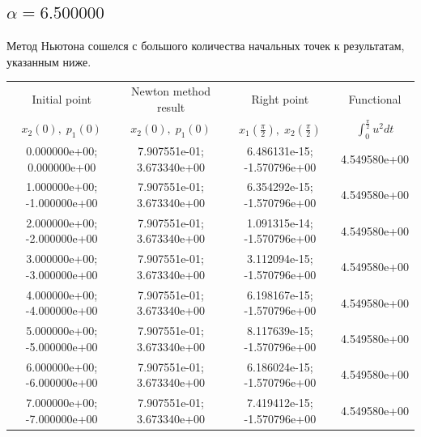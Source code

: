 \documentclass[titlepage]{article}
\def\l{\left}
\def\r{\right}
\begin{document}
\subsection{$\alpha = 6.500000$} 
Метод Ньютона сошелся с большого количества начальных точек к результатам, указанным ниже. \\ 
\begin{tabular}{ | c | c | c | c |} 
\hline 
Initial point  & Newton method result & Right point & Functional 
 \\ $x_2(0), \; p_1(0)$ & $x_2(0), \; p_1(0)$ & $x_1\l(\frac{\pi}{2}\r), \; x_2\l(\frac{\pi}{2}\r)$ & $\int_{0}^{\frac{\pi}{2}}u^2dt$  \\ \hline 
0.000000e+00; 0.000000e+00 & 7.907551e-01; 3.673340e+00 & 6.486131e-15; -1.570796e+00 & 4.549580e+00 \\ \hline 
1.000000e+00; -1.000000e+00 & 7.907551e-01; 3.673340e+00 & 6.354292e-15; -1.570796e+00 & 4.549580e+00 \\ \hline 
2.000000e+00; -2.000000e+00 & 7.907551e-01; 3.673340e+00 & 1.091315e-14; -1.570796e+00 & 4.549580e+00 \\ \hline 
3.000000e+00; -3.000000e+00 & 7.907551e-01; 3.673340e+00 & 3.112094e-15; -1.570796e+00 & 4.549580e+00 \\ \hline 
4.000000e+00; -4.000000e+00 & 7.907551e-01; 3.673340e+00 & 6.198167e-15; -1.570796e+00 & 4.549580e+00 \\ \hline 
5.000000e+00; -5.000000e+00 & 7.907551e-01; 3.673340e+00 & 8.117639e-15; -1.570796e+00 & 4.549580e+00 \\ \hline 
6.000000e+00; -6.000000e+00 & 7.907551e-01; 3.673340e+00 & 6.186024e-15; -1.570796e+00 & 4.549580e+00 \\ \hline 
7.000000e+00; -7.000000e+00 & 7.907551e-01; 3.673340e+00 & 7.419412e-15; -1.570796e+00 & 4.549580e+00 \\ \hline 
\end{tabular} 
\end{document}
